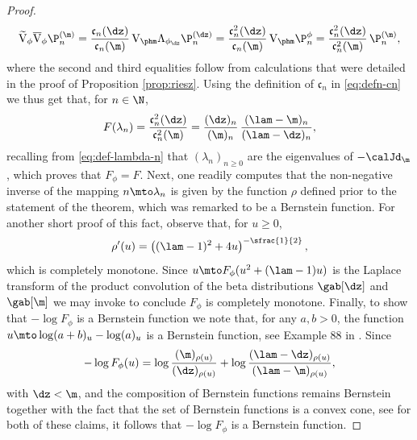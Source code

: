 \begin{proof}
\begin{equation*}
\widetilde{\mathrm{V}}_{\phi}\overline{\mathrm{V}}_{\phi} \P_n^{(\m)} = \frac{\mathfrak{c}_n(\dz)}{\mathfrak{c}_n(\m)}\, \mathrm{V}_{\phm} \Lambda_{\phi_{\dz}} \P_n^{(\dz)} = \frac{\mathfrak{c}_n^2(\dz)}{\mathfrak{c}_n(\m)}\, \mathrm{V}_{\phm} \P_n^\phi = \frac{\mathfrak{c}_n^2(\dz)}{\mathfrak{c}_n^2(\m)}\, \P_n^{(\m)},
\end{equation*}
where the second and third equalities follow from calculations that were detailed in the proof of Proposition \ref{prop:riesz}. Using the definition of $\mathfrak{c}_n$ in \eqref{eq:defn-cn} we thus get that, for $n \in \N$,
\begin{equation*}
F(\lambda_n) = \frac{\mathfrak{c}_n^2(\dz)}{\mathfrak{c}_n^2(\m)} = \frac{(\dz)_n}{(\m)_n}\, \frac{(\lam-\m)_n}{(\lam-\dz)_n},
\end{equation*}
recalling from \eqref{eq:def-lambda-n} that $(\lambda_n)_{n \geq 0}$ are the eigenvalues of $-\calJd_{\m}$, which proves that $F_\phi = F$. Next, one readily computes that the non-negative inverse of the mapping $n \mto \lambda_n$ is given by the function $\rho$ defined prior to the statement of the theorem, which was remarked to be a Bernstein function. For another short proof of this fact, observe that, for $u \geq 0$,
\begin{equation*}
\rho'(u) = \left((\lam-1)^2+4u\right)^{-\sfrac{1}{2}},
\end{equation*}
which is completely monotone. Since $u \mto F_\phi(u^2+(\lam-1)u)$ is the Laplace transform of the product convolution of the beta distributions $\gab[\dz]$ and $\gab[\m]$ we may invoke \cite[Th.\,3.7]{SchillingSongVondracek10} to conclude $F_\phi$ is completely monotone. Finally, to show that $-\log F_\phi$ is a Bernstein function we note that, for any $a, b > 0$, the function $u \mto \log (a+b)_u - \log (a)_u$ is a Bernstein function, see \eg Example 88 in \cite[Chap.\,16]{SchillingSongVondracek10}. Since
\begin{equation*}
-\log F_\phi(u) = \log \frac{(\m)_{\rho(u)}}{(\dz)_{\rho(u)}} + \log \frac{(\lam-\dz)_{\rho(u)}}{(\lam-\m)_{\rho(u)}},
\end{equation*}
with $\dz < \m$, and the composition of Bernstein functions remains Bernstein together with the fact that the set of Bernstein functions is a convex cone, see \eg \cite[Cor.\,3.8]{SchillingSongVondracek10} for both of these claims, it follows that $-\log F_\phi$ is a Bernstein function.
\end{proof}

